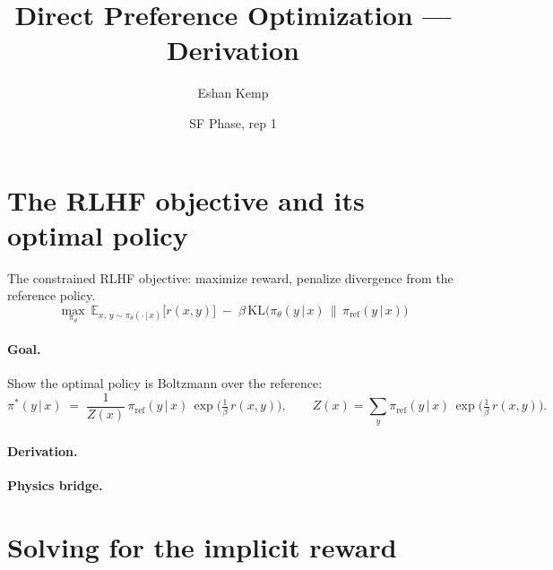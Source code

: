 \documentclass[11pt]{article}
\title{Direct Preference Optimization --- Derivation}
\author{Eshan Kemp}
\date{SF Phase, rep 1}
\newcommand{\pit}{\pi_\theta}
\newcommand{\piref}{\pi_{\text{ref}}}
\newcommand{\given}{\,\vert\,}
\newcommand{\E}{\mathbb{E}}
\newcommand{\KL}{\mathrm{KL}}
\begin{document}
\maketitle

\section{The RLHF objective and its optimal policy}

The constrained RLHF objective: maximize reward, penalize divergence
from the reference policy.
\begin{equation}
  \max_{\pit}\ \E_{x,\, y \sim \pit(\cdot \given x)}
  \big[ r(x,y) \big]
  \;-\; \beta\, \KL\!\big( \pit(y \given x) \,\|\, \piref(y \given x) \big)
  \label{eq:objective}
\end{equation}

\paragraph{Goal.} Show the optimal policy is Boltzmann over the reference:
\begin{equation}
  \pi^*(y \given x) \;=\; \frac{1}{Z(x)}\,
  \piref(y \given x)\, \exp\!\Big( \tfrac{1}{\beta}\, r(x,y) \Big),
  \qquad
  Z(x) = \sum_{y} \piref(y \given x)\, \exp\!\Big( \tfrac{1}{\beta}\, r(x,y) \Big).
  \label{eq:optimal}
\end{equation}

\paragraph{Derivation.} %


\bigskip
\noindent\textbf{Physics bridge.} %


\section{Solving for the implicit reward}
\end{document}
